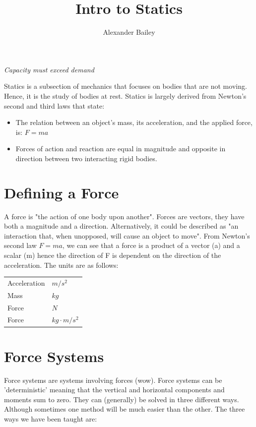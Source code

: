 \documentclass[a4paper, 12pt]{article}
\begin{document}
\title{Intro to Statics}
\author{Alexander Bailey}
\maketitle
\begin{center}
\textit{Capacity must exceed demand}
\end{center}
Statics is a subsection of mechanics that focuses on bodies that are not moving.
Hence, it is the study of bodies at rest.
Statics is largely derived from Newton's second and third laws that state:

\begin{itemize}
    \item The relation between an object's mass, its acceleration, and the applied force, is: $F=ma$
    \item Forces of action and reaction are equal in magnitude and opposite in direction between two interacting rigid bodies.
\end{itemize}

\section{Defining a Force}
A force is "the action of one body upon another". Forces are vectors, they have both a magnitude and a direction.
Alternatively, it could be described as "an interaction that, when unopposed, will cause an object to move". 
From Newton's second law $F=ma$, we can see that a force is a product of a vector (a) and a scalar (m) hence
the direction of F is dependent on the direction of the acceleration. The units are as follows:  
\begin{center}
\begin{tabular}{l|l}
    Acceleration & $m/s^2$ \\
    Mass & $kg$ \\
    Force & $N$ \\
    Force & $kg\cdot m/s^2$ \\
\end{tabular}
\end{center}
\newpage
\section{Force Systems}
Force systems are systems involving forces (wow). Force systems can be 'deterministic' meaning that the vertical and horizontal components and moments sum to zero.
They can (generally) be solved in three different ways.
Although sometimes one method will be much easier than the other. The three ways we have been taught are:
\end{document}
